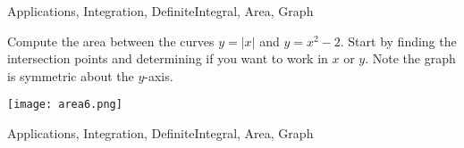\begin{tagblock}{Applications, Integration, DefiniteIntegral, Area, Graph}
\begin{question}
	


Compute the area between the curves $y=|x|$ and $y=x^2-2$.   Start by finding the intersection points and determining if you want to work in $x$ or $y$.  Note the graph is symmetric about the $y$-axis.

\texttt{[image: area6.png]} 

    
\begin{tags}
       Applications, Integration, DefiniteIntegral, Area, Graph
\end{tags}
    
\begin{diary}
\end{diary}
	
\begin{solution}

\end{solution}
	
\end{question}

\end{tagblock}

